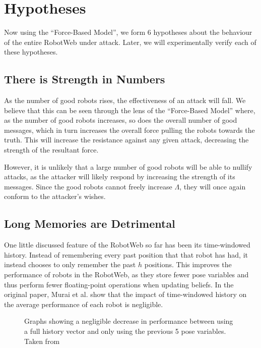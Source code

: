 \section{Hypotheses}
Now using the ``Force-Based Model'', we form 6 hypotheses about the behaviour of the entire RobotWeb under attack. Later, we will experimentally verify each of these hypotheses.

\subsection{There is Strength in Numbers} \label{hyp:strength_in_numbers}
As the number of good robots rises, the effectiveness of an attack will fall. We believe that this can be seen through the lens of the ``Force-Based Model'' where, as the number of good robots increases, so does the overall number of good messages, which in turn increases the overall force pulling the robots towards the truth. This will increase the resistance against any given attack, decreasing the strength of the resultant force.

However, it is unlikely that a large number of good robots will be able to nullify attacks, as the attacker will likely respond by increasing the strength of its messages. Since the good robots cannot freely increase $\Lambda$, they will once again conform to the attacker's wishes.

\subsection{Long Memories are Detrimental} \label{hyp:history} %
One little discussed feature of the RobotWeb so far has been its time-windowed history. Instead of remembering every past position that that robot has had, it instead chooses to only remember the past $h$ positions. This improves the performance of robots in the RobotWeb, as they store fewer pose variables and thus perform fewer floating-point operations when updating beliefs. In the original paper, Murai et al. show that the impact of time-windowed history on the average performance of each robot is negligible.


\begin{figure}[!h]
    \centering
	\caption[The negligible effect of using time-windowed history]{Graphs showing a negligible decrease in performance between using a full history vector and only using the previous 5 pose variables. Taken from \cite[Figure~3]{Robotweb}}
\end{figure}


